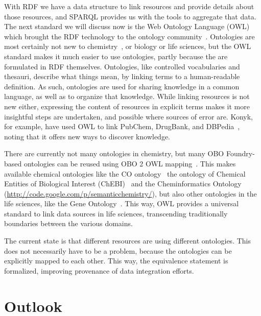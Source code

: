 \documentclass[10pt]{bmc_article}
\newenvironment{bmcformat}{\begin{raggedright}\baselineskip20pt\sloppy\setboolean{publ}{false}}{\end{raggedright}\baselineskip20pt\sloppy}
\begin{document}
\begin{bmcformat}
With RDF we have a data structure to link resources and provide details about
those resources, and SPARQL provides us with the tools to aggregate that data.
The next standard we will discuss now is the Web Ontology
Language (OWL) which brought the RDF technology to the ontology community~\cite{GUN2004}.
Ontologies are most certainly not new to chemistry~\cite{Gordon1988}, or biology or life sciences,
but the OWL standard makes it much easier to use ontologies, partly because
the are formulated in RDF themselves. Ontologies, like
controlled vocabularies and thesauri, describe what things mean, by linking
terms to a human-readable definition. As such, ontologies are used for sharing
knowledge in a common language, as well as to organize that knowledge.
While linking resources is not new either, expressing the content of resources
in explicit terms makes it more insightful steps are undertaken, and possible
where sources of error are. Konyk, for example, have used OWL to link PubChem,
DrugBank, and DBPedia~\cite{Konyk2008}, noting that it offers new ways to
discover knowledge.

There are currently not many ontologies in chemistry, but many OBO Foundry-based
ontologies can be reused using OBO 2 OWL mapping~\cite{Moreira2007}. This makes
available chemical ontologies like the CO ontology~\cite{Feldman2005}
the ontology of Chemical Entities of Biological Interest (ChEBI)~\cite{Degtyarenko2008,Hull2008}
and the Cheminformatics Ontology (\url{http://code.google.com/p/semanticchemistry/}),
but also other ontologies in the life sciences, like the Gene Ontology~\cite{Aranguren2007}.
This way, OWL provides a universal standard to link data sources in life
sciences, transcending traditionally boundaries between the various domains.

The current state is that different resources are using different ontologies.
This does not necessarily have to be a problem, because the ontologies can be
explicitly mapped to each other. This way, the equivalence statement is formalized,
improving provenance of data integration efforts.

\section{Outlook}


\end{bmcformat}
\end{document}
